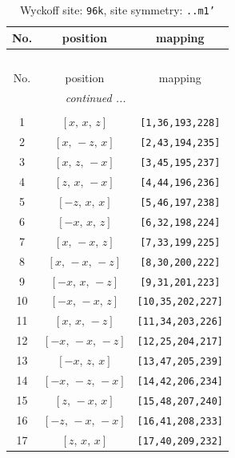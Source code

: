 \documentclass[fleqn,8pt]{jsarticle}
\begin{document}
\begin{longtable}{ccc}
\caption{Wyckoff site: {\tt 96k}, site symmetry: {\tt ..m1'}}
 \\
 \hline \hline
No. & position & mapping \\ \hline \endfirsthead

\multicolumn{2}{l}{\tablename\ \thetable{}} \\
 \hline \hline
No. & position & mapping \\ \hline \endhead

 \hline \hline
\multicolumn{2}{r}{\footnotesize\it continued ...} \\ \endfoot

 \hline \hline
\multicolumn{2}{r}{} \\ \endlastfoot

1 & $\left[ x,\, x,\, z \right]$ & {\tt [1,36,193,228]} \\ \hline
2 & $\left[ x,\, - z,\, x \right]$ & {\tt [2,43,194,235]} \\ \hline
3 & $\left[ x,\, z,\, - x \right]$ & {\tt [3,45,195,237]} \\ \hline
4 & $\left[ z,\, x,\, - x \right]$ & {\tt [4,44,196,236]} \\ \hline
5 & $\left[ - z,\, x,\, x \right]$ & {\tt [5,46,197,238]} \\ \hline
6 & $\left[ - x,\, x,\, z \right]$ & {\tt [6,32,198,224]} \\ \hline
7 & $\left[ x,\, - x,\, z \right]$ & {\tt [7,33,199,225]} \\ \hline
8 & $\left[ x,\, - x,\, - z \right]$ & {\tt [8,30,200,222]} \\ \hline
9 & $\left[ - x,\, x,\, - z \right]$ & {\tt [9,31,201,223]} \\ \hline
10 & $\left[ - x,\, - x,\, z \right]$ & {\tt [10,35,202,227]} \\ \hline
11 & $\left[ x,\, x,\, - z \right]$ & {\tt [11,34,203,226]} \\ \hline
12 & $\left[ - x,\, - x,\, - z \right]$ & {\tt [12,25,204,217]} \\ \hline
13 & $\left[ - x,\, z,\, x \right]$ & {\tt [13,47,205,239]} \\ \hline
14 & $\left[ - x,\, - z,\, - x \right]$ & {\tt [14,42,206,234]} \\ \hline
15 & $\left[ z,\, - x,\, x \right]$ & {\tt [15,48,207,240]} \\ \hline
16 & $\left[ - z,\, - x,\, - x \right]$ & {\tt [16,41,208,233]} \\ \hline
17 & $\left[ z,\, x,\, x \right]$ & {\tt [17,40,209,232]} \\ \hline

\end{longtable}
\end{document}
